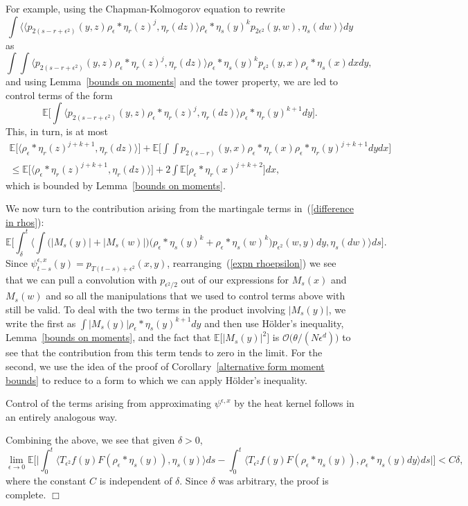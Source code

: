 \documentclass[12pt]{article}
\newenvironment {proof}{{\noindent\bf Proof }}{\hfill $\Box$ \medskip}
\newcommand{\IE}{\mathbb E}
\numberwithin{equation}{section}
\begin{document}
\begin{proof}
For example, using the Chapman-Kolmogorov equation to rewrite
\[
\int\Big\langle 
\big\langle p_{2(s-r+\epsilon^2)}(y,z)\rho_\epsilon*\eta_r(z)^j, \eta_r(dz)
\big\rangle
\rho_\epsilon*\eta_s(y)^k p_{2\epsilon^2}(y,w), \eta_s(dw)\Big\rangle dy
\]
as 
\[
\int\int
\big\langle p_{2(s-r+\epsilon^2)}(y,z)\rho_\epsilon*\eta_r(z)^j, \eta_r(dz)
\big\rangle
\rho_\epsilon*\eta_s(y)^k p_{\epsilon^2}(y,x)\rho_\epsilon*\eta_s(x) dx dy,
\]
and using Lemma~\ref{bounds on moments} and the tower property, we are led to 
control terms of the form
\[
\IE\Big[\int\big\langle p_{2(s-r+\epsilon^2)}(y,z)\rho_\epsilon*\eta_r(z)^j, 
\eta_r(dz)\big\rangle \rho_\epsilon*\eta_r(y)^{k+1} dy\Big].
\]
This, in turn, is at most
\begin{multline*}
\IE\Big[\big\langle \rho_\epsilon*\eta_r(z)^{j+k+1}, \eta_r(dz)\rangle\Big]
+\IE\Big[\int\int p_{2(s-r)}(y,x)\rho_\epsilon*\eta_r(x)
	\rho_\epsilon*\eta_r(y)^{j+k+1} dy dx\Big]
\\
\leq
\IE\Big[\big\langle \rho_\epsilon*\eta_r(z)^{j+k+1}, \eta_r(dz)\rangle\Big]
+2\int\IE\Big[\rho_\epsilon*\eta_r(x)^{j+k+2}\Big]dx,
\end{multline*} 
which is bounded by Lemma~\ref{bounds on moments}.

We now turn to the contribution arising from the martingale terms 
in~(\ref{difference in rhos}):
\[
\IE\Big[
\int_\delta^t\Big\langle\int 
\big(|M_s(y)|+|M_s(w)|\big)\big(\rho_\epsilon*\eta_s(y)^k+
\rho_\epsilon*\eta_s(w)^k\big)p_{\epsilon^2}(w,y)dy, \eta_s(dw)\Big\rangle ds
\Big] .
\]
Since $\psi_{t-s}^{\epsilon,x}(y)=p_{T(t-s)+\epsilon^2}(x,y)$, 
rearranging~(\ref{expn rhoepsilon})
we see that we can pull a convolution with $p_{\epsilon^2/2}$ out of
our expressions for $M_s(x)$ and $M_s(w)$ and so all the manipulations 
that we used to control terms above with still be valid.
To deal with the two terms in the product involving $|M_s(y)|$, we write 
the first as $\int |M_s(y)|\rho_\epsilon*\eta_s(y)^{k+1}dy$ and then use
H\"older's inequality, Lemma~\ref{bounds on moments}, and the fact
that $\IE\big[|M_s(y)|^2\big]$ is ${\mathcal O}\big(\theta/(N\epsilon^d)\big)$
to see that the contribution from this term tends to zero in the limit.
For the second, we use the idea of the proof of 
Corollary~\ref{alternative form moment bounds} to reduce to a form to which
we can apply H\"older's inequality.

Control of the terms arising from approximating $\psi^{\epsilon,x}$
by the heat kernel follows in an entirely analogous way.

Combining the above, we see that given $\delta>0$, 
\[
\lim_{\epsilon\to 0}\IE\Big[\Big|\int_0^t\big\langle T_{\epsilon^2} f(y) 
F(\rho_\epsilon *\eta_s(y)), \eta_s(y) \big\rangle ds 
- \int_0^t\big\langle T_{\epsilon^2} f(y) 
F(\rho_\epsilon * \eta_s(y)), \rho_\epsilon * \eta_s(y) dy 
\big\rangle ds\Big|\Big]
<C\delta,
\]
where the constant $C$ is independent of $\delta$.
Since $\delta$ was arbitrary, the proof is complete.
\end{proof}
\end{document}
